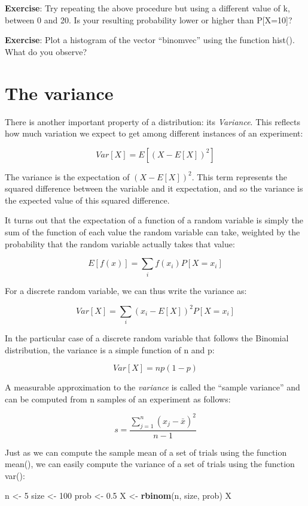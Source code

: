 \documentclass[
]{book}
\newenvironment{Shaded}{\begin{snugshade}}{\end{snugshade}}
\newcommand{\DecValTok}[1]{\textcolor[rgb]{0.00,0.00,0.81}{#1}}
\newcommand{\FloatTok}[1]{\textcolor[rgb]{0.00,0.00,0.81}{#1}}
\newcommand{\KeywordTok}[1]{\textcolor[rgb]{0.13,0.29,0.53}{\textbf{#1}}}
\newcommand{\NormalTok}[1]{#1}
\newcommand{\StringTok}[1]{\textcolor[rgb]{0.31,0.60,0.02}{#1}}
\begin{document}
\textbf{Exercise}: Try repeating the above procedure but using a different value of k, between 0 and 20. Is your resulting probability lower or higher than P{[}X=10{]}?

\textbf{Exercise}: Plot a histogram of the vector ``binomvec'' using the function hist(). What do you observe?

\hypertarget{the-variance}{%
\section{The variance}\label{the-variance}}

There is another important property of a distribution: its \emph{Variance}. This reflects how much variation we expect to get among different instances of an experiment:

\[Var[X] = E[(X-E[X])^{2}]\]

The variance is the expectation of \((X-E[X])^{2}\). This term represents the squared difference between the variable and it expectation, and so the variance is the expected value of this squared difference.

It turns out that the expectation of a function of a random variable is simply the sum of the function of each value the random variable can take, weighted by the probability that the random variable actually takes that value:

\[E[f(x)] = \sum_{i}f(x_i)P[X=x_i]\]

For a discrete random variable, we can thus write the variance as:

\[Var[X] = \sum_{i}(x_i-E[X])^{2}P[X=x_i]\]

In the particular case of a discrete random variable that follows the Binomial distribution, the variance is a simple function of n and p:

\[Var[X] = n p(1-p)\]

A measurable approximation to the \emph{variance} is called the ``sample variance'' and can be computed from n samples of an experiment as follows:

\[s = \frac{\sum_{j=1}^{n}(x_{j} - \bar{x})^{2}}{n-1}\]

Just as we can compute the sample mean of a set of trials using the function mean(), we can easily compute the variance of a set of trials using the function var():

\begin{Shaded}
\begin{Highlighting}[]
\NormalTok{n \textless{}{-}}\StringTok{ }\DecValTok{5}
\NormalTok{size \textless{}{-}}\StringTok{ }\DecValTok{100}
\NormalTok{prob \textless{}{-}}\StringTok{ }\FloatTok{0.5}
\NormalTok{X \textless{}{-}}\StringTok{ }\KeywordTok{rbinom}\NormalTok{(n, size, prob)}
\NormalTok{X}
\end{Highlighting}
\end{Shaded}
\end{document}
